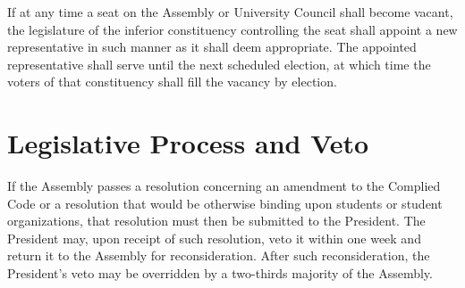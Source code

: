     If at any time a seat on the Assembly or University Council shall become vacant, the legislature of the inferior constituency controlling the seat shall appoint a new representative in such manner as it shall deem appropriate. The appointed representative shall serve until the next scheduled election, at which time the voters of that constituency shall fill the vacancy by election.

\section{Legislative Process and Veto}
    If the Assembly passes a resolution concerning an amendment to the Complied Code or a resolution that would be otherwise binding upon students or student organizations, that resolution must then be submitted to the President. The President may, upon receipt of such resolution, veto it within one week and return it to the Assembly for reconsideration. After such reconsideration, the President's veto may be overridden by a  two-thirds majority of the Assembly.
